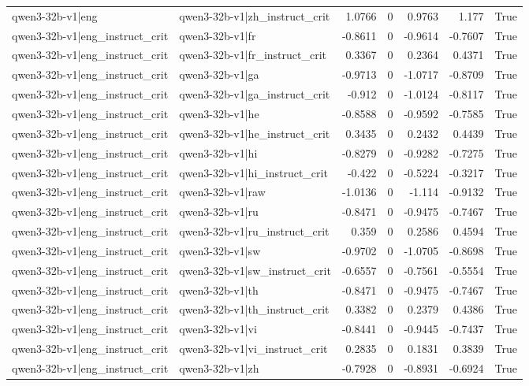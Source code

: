 \begin{table}
\begin{tabular}{l l r r r r l}
qwen3-32b-v1|eng & qwen3-32b-v1|zh_instruct_crit & 1.0766 & 0 & 0.9763 & 1.177 & True \\
qwen3-32b-v1|eng_instruct_crit & qwen3-32b-v1|fr & -0.8611 & 0 & -0.9614 & -0.7607 & True \\
qwen3-32b-v1|eng_instruct_crit & qwen3-32b-v1|fr_instruct_crit & 0.3367 & 0 & 0.2364 & 0.4371 & True \\
qwen3-32b-v1|eng_instruct_crit & qwen3-32b-v1|ga & -0.9713 & 0 & -1.0717 & -0.8709 & True \\
qwen3-32b-v1|eng_instruct_crit & qwen3-32b-v1|ga_instruct_crit & -0.912 & 0 & -1.0124 & -0.8117 & True \\
qwen3-32b-v1|eng_instruct_crit & qwen3-32b-v1|he & -0.8588 & 0 & -0.9592 & -0.7585 & True \\
qwen3-32b-v1|eng_instruct_crit & qwen3-32b-v1|he_instruct_crit & 0.3435 & 0 & 0.2432 & 0.4439 & True \\
qwen3-32b-v1|eng_instruct_crit & qwen3-32b-v1|hi & -0.8279 & 0 & -0.9282 & -0.7275 & True \\
qwen3-32b-v1|eng_instruct_crit & qwen3-32b-v1|hi_instruct_crit & -0.422 & 0 & -0.5224 & -0.3217 & True \\
qwen3-32b-v1|eng_instruct_crit & qwen3-32b-v1|raw & -1.0136 & 0 & -1.114 & -0.9132 & True \\
qwen3-32b-v1|eng_instruct_crit & qwen3-32b-v1|ru & -0.8471 & 0 & -0.9475 & -0.7467 & True \\
qwen3-32b-v1|eng_instruct_crit & qwen3-32b-v1|ru_instruct_crit & 0.359 & 0 & 0.2586 & 0.4594 & True \\
qwen3-32b-v1|eng_instruct_crit & qwen3-32b-v1|sw & -0.9702 & 0 & -1.0705 & -0.8698 & True \\
qwen3-32b-v1|eng_instruct_crit & qwen3-32b-v1|sw_instruct_crit & -0.6557 & 0 & -0.7561 & -0.5554 & True \\
qwen3-32b-v1|eng_instruct_crit & qwen3-32b-v1|th & -0.8471 & 0 & -0.9475 & -0.7467 & True \\
qwen3-32b-v1|eng_instruct_crit & qwen3-32b-v1|th_instruct_crit & 0.3382 & 0 & 0.2379 & 0.4386 & True \\
qwen3-32b-v1|eng_instruct_crit & qwen3-32b-v1|vi & -0.8441 & 0 & -0.9445 & -0.7437 & True \\
qwen3-32b-v1|eng_instruct_crit & qwen3-32b-v1|vi_instruct_crit & 0.2835 & 0 & 0.1831 & 0.3839 & True \\
qwen3-32b-v1|eng_instruct_crit & qwen3-32b-v1|zh & -0.7928 & 0 & -0.8931 & -0.6924 & True \\

\end{tabular}
\end{table}
